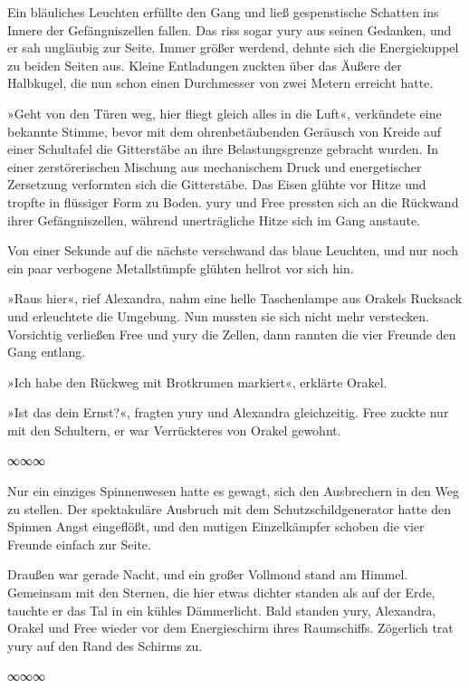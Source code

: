 Ein bläuliches Leuchten erfüllte den Gang und ließ gespenstische Schatten ins Innere der Gefängniszellen fallen. Das riss sogar yury aus seinen Gedanken, und er sah ungläubig zur Seite. Immer größer werdend, dehnte sich die Energiekuppel zu beiden Seiten aus. Kleine Entladungen zuckten über das Äußere der Halbkugel, die nun schon einen Durchmesser von zwei Metern erreicht hatte.

»Geht von den Türen weg, hier fliegt gleich alles in die Luft«, verkündete eine bekannte Stimme, bevor mit dem ohrenbetäubenden Geräusch von Kreide auf einer Schultafel die Gitterstäbe an ihre Belastungsgrenze gebracht wurden. In einer zerstörerischen Mischung aus mechanischem Druck und energetischer Zersetzung verformten sich die Gitterstäbe. Das Eisen glühte vor Hitze und tropfte in flüssiger Form zu Boden. yury und Free pressten sich an die Rückwand ihrer Gefängniszellen, während unerträgliche Hitze sich im Gang anstaute.

Von einer Sekunde auf die nächste verschwand das blaue Leuchten, und nur noch ein paar verbogene Metallstümpfe glühten hellrot vor sich hin.

»Raus hier«, rief Alexandra, nahm eine helle Taschenlampe aus Orakels Rucksack und erleuchtete die Umgebung. Nun mussten sie sich nicht mehr verstecken. Vorsichtig verließen Free und yury die Zellen, dann rannten die vier Freunde den Gang entlang.

»Ich habe den Rückweg mit Brotkrumen markiert«, erklärte Orakel.

»Ist das dein Ernst?«, fragten yury und Alexandra gleichzeitig. Free zuckte nur mit den Schultern, er war Verrückteres von Orakel gewohnt.

\begin{center}
    ∞∞∞
\end{center}

Nur ein einziges Spinnenwesen hatte es gewagt, sich den Ausbrechern in den Weg zu stellen. Der spektakuläre Ausbruch mit dem Schutzschildgenerator hatte den Spinnen Angst eingeflößt, und den mutigen Einzelkämpfer schoben die vier Freunde einfach zur Seite.

Draußen war gerade Nacht, und ein großer Vollmond stand am Himmel. Gemeinsam mit den Sternen, die hier etwas dichter standen als auf der Erde, tauchte er das Tal in ein kühles Dämmerlicht. Bald standen yury, Alexandra, Orakel und Free wieder vor dem Energieschirm ihres Raumschiffs. Zögerlich trat yury auf den Rand des Schirms zu.

\begin{center}
    ∞∞∞
\end{center}

